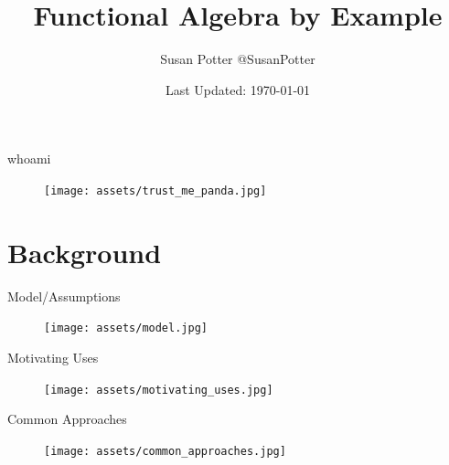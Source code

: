\documentclass[compress]{beamer}
\title{Functional Algebra by Example}
\date{Last Updated: \today}
\author{Susan Potter \small{@SusanPotter}}
\begin{document}

\maketitle


\begin{frame}{whoami}
  \begin{figure}
    \centering
    \texttt{[image: assets/trust\_me\_panda.jpg]}
  \end{figure}
\end{frame}

\section{Background}

\begin{frame}{Model/Assumptions}
  \begin{figure}
    \texttt{[image: assets/model.jpg]}
  \end{figure}
\end{frame}

\begin{frame}{Motivating Uses}
  \begin{figure}
    \texttt{[image: assets/motivating\_uses.jpg]}
  \end{figure}
\end{frame}

\begin{frame}{Common Approaches}
  \begin{figure}
    \texttt{[image: assets/common\_approaches.jpg]}
  \end{figure}
\end{frame}
\end{document}
